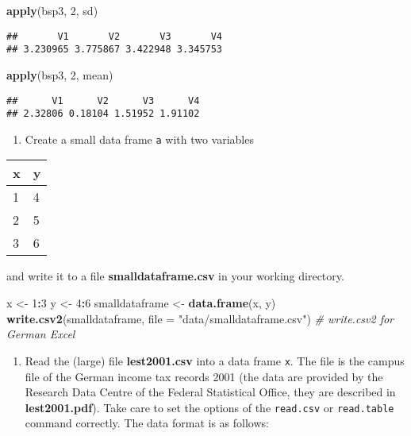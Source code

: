 \documentclass[]{article}
\newenvironment{Shaded}{\begin{snugshade}}{\end{snugshade}}
\newcommand{\KeywordTok}[1]{\textcolor[rgb]{0.13,0.29,0.53}{\textbf{#1}}}
\newcommand{\DataTypeTok}[1]{\textcolor[rgb]{0.13,0.29,0.53}{#1}}
\newcommand{\DecValTok}[1]{\textcolor[rgb]{0.00,0.00,0.81}{#1}}
\newcommand{\StringTok}[1]{\textcolor[rgb]{0.31,0.60,0.02}{#1}}
\newcommand{\CommentTok}[1]{\textcolor[rgb]{0.56,0.35,0.01}{\textit{#1}}}
\newcommand{\OperatorTok}[1]{\textcolor[rgb]{0.81,0.36,0.00}{\textbf{#1}}}
\newcommand{\NormalTok}[1]{#1}
\providecommand{\tightlist}{%
  \setlength{\itemsep}{0pt}\setlength{\parskip}{0pt}}
\begin{document}
\begin{Shaded}
\begin{Highlighting}[]
\KeywordTok{apply}\NormalTok{(bsp3, }\DecValTok{2}\NormalTok{, sd)}
\end{Highlighting}
\end{Shaded}

\begin{verbatim}
##       V1       V2       V3       V4 
## 3.230965 3.775867 3.422948 3.345753
\end{verbatim}

\begin{Shaded}
\begin{Highlighting}[]
\KeywordTok{apply}\NormalTok{(bsp3, }\DecValTok{2}\NormalTok{, mean)}
\end{Highlighting}
\end{Shaded}

\begin{verbatim}
##      V1      V2      V3      V4 
## 2.32806 0.18104 1.51952 1.91102
\end{verbatim}

\begin{enumerate}
\def\labelenumi{\arabic{enumi}.}
\setcounter{enumi}{5}
\tightlist
\item
  Create a small data frame \texttt{a} with two variables
\end{enumerate}

\begin{longtable}[]{@{}ll@{}}
\toprule
x & y\tabularnewline
\midrule
\endhead
1 & 4\tabularnewline
2 & 5\tabularnewline
3 & 6\tabularnewline
\bottomrule
\end{longtable}

and write it to a file \textbf{smalldataframe.csv} in your working
directory.

\begin{Shaded}
\begin{Highlighting}[]
\NormalTok{x <-}\StringTok{ }\DecValTok{1}\OperatorTok{:}\DecValTok{3}
\NormalTok{y <-}\StringTok{ }\DecValTok{4}\OperatorTok{:}\DecValTok{6}
\NormalTok{smalldataframe <-}\StringTok{ }\KeywordTok{data.frame}\NormalTok{(x, y)}
\KeywordTok{write.csv2}\NormalTok{(smalldataframe, }\DataTypeTok{file =} \StringTok{"data/smalldataframe.csv"}\NormalTok{)  }\CommentTok{# write.csv2 for German Excel}
\end{Highlighting}
\end{Shaded}

\begin{enumerate}
\def\labelenumi{\arabic{enumi}.}
\setcounter{enumi}{6}
\tightlist
\item
  Read the (large) file \textbf{lest2001.csv} into a data frame
  \texttt{x}. The file is the campus file of the German income tax
  records 2001 (the data are provided by the Research Data Centre of the
  Federal Statistical Office, they are described in
  \textbf{lest2001.pdf}). Take care to set the options of the
  \texttt{read.csv} or \texttt{read.table} command correctly. The data
  format is as follows:
\end{enumerate}
\end{document}
